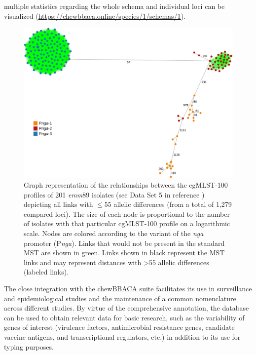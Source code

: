 multiple statistics regarding the whole schema and individual loci can be visualized (\url{https://chewbbaca.online/species/1/schemas/1}).

\begin{figure}[h!]
    \centering
    \includegraphics[width=\textwidth]{figures/chapter 4/Figure6.pdf}
    \caption[Graph representation of the relationships between the cgMLST-100 proﬁles of 201 \textit{emm}89 isolates, depicting all links with $\leq55$ allelic differences (from a total of 1,279 compared loci).]{Graph representation of the relationships between the cgMLST-100 proﬁles of 201 \textit{emm}89 isolates (see Data Set 5 in reference \cite{friaes_supplemental_2023}) depicting all links with $\leq55$ allelic differences (from a total of 1,279 compared loci). The size of each node is proportional to the number of isolates with that particular cgMLST-100 proﬁle on a logarithmic scale. Nodes are colored according to the variant of the \textit{nga} promoter (P\textit{nga}). Links that would not be present in the standard \ac{MST} are shown in green. Links shown in black represent the \ac{MST} links and may represent distances with >55 allelic differences (labeled links).}
    \label{fig:chap4_figure6}
\end{figure}

The close integration with the chewBBACA suite \cite{silva_chewbbaca_2018} facilitates its use in surveillance and epidemiological studies and the maintenance of a common nomenclature across different studies. By virtue of the comprehensive annotation, the database can be used to obtain relevant data for basic research, such as the variability of genes of interest (virulence factors, antimicrobial resistance genes, candidate vaccine antigens, and transcriptional regulators, etc.) \cite{davies_atlas_2019, beres_integrative_2022} in addition to its use for typing purposes.

